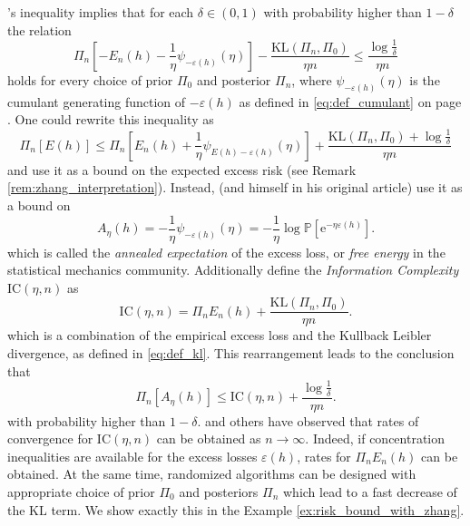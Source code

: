 \documentclass{uvamath}
\newcommand*{\bbP}{\mathbb{P}}
\newcommand*{\sqbrack}[1]{\left[#1\right]}
\newcommand*{\rme}{\mathrm{e}}
\newcommand*{\KL}{\mathrm{KL}}
\newcommand*{\IC}{\mathrm{IC}}
\theoremstyle{remark}
\theoremstyle{definition}
\theoremstyle{definition}
\theoremstyle{definition}
\theoremstyle{definition}
\theoremstyle{definition}
\begin{document}
\citeauthor{zhang_information-theoretic_2006}'s inequality implies
that for each $\delta\in(0,1)$ with probability higher than $1-\delta$
the relation
\begin{equation}\label{eq:zhang_implication}
  \Pi_n\sqbrack{ - E_n(h) -
          \frac{1}{\eta }\psi_{ - \varepsilon(h)}(\eta)} -
          \frac{\KL(\Pi_n, \Pi_0)}{\eta n}\leq
        \frac{\log\frac{1}{\delta}}{\eta n}
\end{equation}
holds for every choice of prior $\Pi_0$ and posterior $\Pi_n$, where
$\psi_{-\varepsilon(h)}(\eta)$ is the cumulant generating function of
$-\varepsilon(h)$ as defined in \eqref{eq:def_cumulant} on page
\pageref{eq:def_cumulant}. One could rewrite this inequality as
\begin{equation*}
  \Pi_n\sqbrack{E(h)} \leq  \Pi_n\sqbrack{E_n(h) +\frac{1}{\eta }\psi_{E(h) - \varepsilon(h)}(\eta)} +
  \frac{\KL(\Pi_n, \Pi_0) + \log\frac{1}{\delta}}{\eta n}
\end{equation*}
and use it as a bound on the expected excess risk (see Remark
\ref{rem:zhang_interpretation}). Instead, \citet{grunwald_fast_2016}
(and \citeauthor{zhang_information-theoretic_2006} himself in his
original article) use it as a bound on
\begin{equation}\label{eq:annealed_definition}
  A_\eta(h) =  -\frac{1}{\eta}\psi_{-\varepsilon(h)}(\eta) = -\frac{1}{\eta}\log \bbP[\rme^{-\eta \varepsilon(h)}].
\end{equation}
which is called the \textit{annealed expectation} of the excess loss,
or \textit{free energy} in the statistical mechanics
community. Additionally define the \textit{Information Complexity}
$\IC(\eta, n)$ as
\begin{equation}\label{eq:def_ic}
  \IC(\eta,n) = \Pi_nE_n(h)  + \frac{\KL(\Pi_n, \Pi_0)}{\eta n}.
\end{equation}
which is a combination of the empirical excess loss and the Kullback
Leibler divergence, as defined in \eqref{eq:def_kl}. This rearrangement
leads to the conclusion that
\begin{equation*}
  \Pi_n\sqbrack{A_\eta(h)} \leq \IC(\eta,n)+ \frac{\log\frac{1}{\delta}}{\eta n}.
\end{equation*}
with probability higher than $1-\delta$. \citet{grunwald_fast_2016}
and others have observed that rates of convergence for $\IC(\eta, n)$
can be obtained as $n\to\infty$. Indeed, if concentration inequalities
are available for the excess losses $\varepsilon(h)$, rates for
$\Pi_nE_n(h)$ can be obtained. At the same time, randomized algorithms
can be designed with appropriate choice of prior $\Pi_0$ and
posteriors $\Pi_n$ which lead to a fast decrease of the $\KL$ term. We
show exactly this in the Example \ref{ex:risk_bound_with_zhang}.
\end{document}
